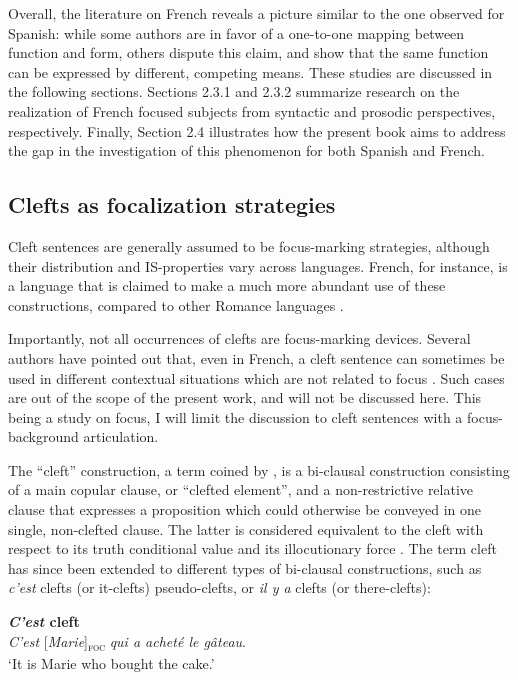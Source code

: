 Overall, the literature on French reveals a picture similar to the one observed for Spanish: while some authors are in favor of a one-to-one mapping between function and form, others dispute this claim, and show that the same function can be expressed by different, competing means. These studies are discussed in the following sections. Sections 2.3.1 and 2.3.2 summarize research on the realization of French focused subjects from syntactic and prosodic perspectives, respectively. Finally, Section 2.4 illustrates how the present book aims to address the gap in the investigation of this phenomenon for both Spanish and French.

\subsection{Clefts as focalization strategies} 
Cleft sentences are generally assumed to be  focus-marking strategies, although their distribution and IS-properties vary across languages. French, for instance, is a language that is claimed to make a much more abundant use of these constructions, compared to other Romance languages \parencite{katz2000categories, dufter2009clefting, decesare2016sintassi, garassino2022pragmatic_interference}.

Importantly, not all occurrences of clefts are focus-marking devices. Several authors have pointed out that, even in French, a cleft sentence can sometimes be used in different contextual situations which are not related to focus \parencite{prince1978comparison, hedberg1990discourse, delin1992properties, dufter2009focus, mertens2012prosodie}.
Such cases are out of the scope of the present work, and will not be discussed here. This being a study on focus, I will limit the discussion to cleft sentences with a focus-background articulation.

The ``cleft” construction, a term coined by \textcite{jespersen1927modern}, is a bi-clausal construction consisting of a main copular clause, or “clefted element”, and a non-restrictive relative clause that expresses a proposition which could otherwise be conveyed in one single, non-clefted clause. The latter is considered equivalent to the cleft with respect to its truth conditional value and its illocutionary force \parencite[457]{lambrecht2001framework}. The term cleft has since been extended to different types of bi-clausal constructions, such as \textit{c'est} clefts (or it-clefts) pseudo-clefts, or \textit{il y a} clefts (or there-clefts):


\ea \label{ex31} \textbf{\textit{C'est} cleft}\\
\textit{C'est} {[\textit{Marie}]\textsubscript{\textsc{foc}}} \normalsize \textit{qui a acheté le gâteau}.\\
`It is Marie who bought the cake.'

